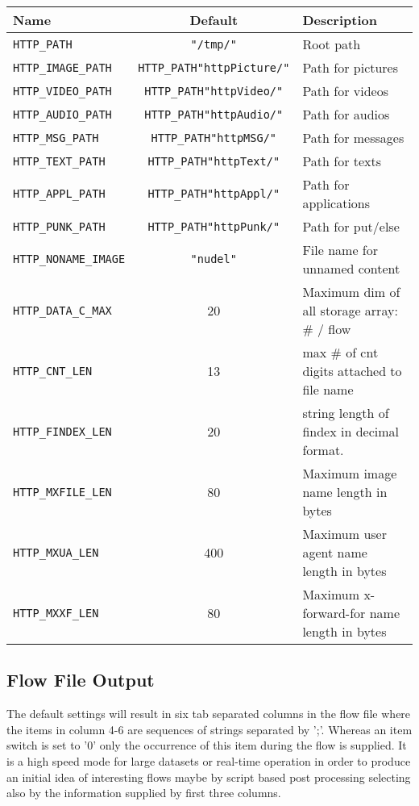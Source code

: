 \documentclass[documentation]{subfiles}
\begin{document}
\begin{longtable}{lcl}
    \toprule
    {\bf Name} & {\bf Default} & {\bf Description} \\
    \midrule\endhead%
    {\tt HTTP\_PATH} & {\tt "/tmp/"} & Root path \\
    {\tt HTTP\_IMAGE\_PATH}   & {\tt\small HTTP\_PATH"httpPicture/"} & Path for pictures \\
    {\tt HTTP\_VIDEO\_PATH}   & {\tt\small HTTP\_PATH"httpVideo/"}   & Path for videos \\
    {\tt HTTP\_AUDIO\_PATH}   & {\tt\small HTTP\_PATH"httpAudio/"}   & Path for audios \\
    {\tt HTTP\_MSG\_PATH}     & {\tt\small HTTP\_PATH"httpMSG/"}     & Path for messages \\
    {\tt HTTP\_TEXT\_PATH}    & {\tt\small HTTP\_PATH"httpText/"}    & Path for texts \\
    {\tt HTTP\_APPL\_PATH}    & {\tt\small HTTP\_PATH"httpAppl/"}    & Path for applications \\
    {\tt HTTP\_PUNK\_PATH}    & {\tt\small HTTP\_PATH"httpPunk/"}    & Path for put/else \\
    {\tt HTTP\_NONAME\_IMAGE} & {\tt\small "nudel"} & File name for unnamed content \\
    {\tt HTTP\_DATA\_C\_MAX}  &  20 & Maximum dim of all storage array: \# / flow \\
    {\tt HTTP\_CNT\_LEN}      &  13 & max \# of cnt digits attached to file name \\
    {\tt HTTP\_FINDEX\_LEN}   &  20 & string length of findex in decimal format. \\
    {\tt HTTP\_MXFILE\_LEN}   &  80 & Maximum image name length in bytes \\
    {\tt HTTP\_MXUA\_LEN}     & 400 & Maximum user agent name length in bytes \\
    {\tt HTTP\_MXXF\_LEN}     &  80 & Maximum x-forward-for name length in bytes \\
    \bottomrule
\end{longtable}

\subsection{Flow File Output}
The default settings will result in six tab separated columns in the flow file where the items
in column 4-6 are sequences of strings separated by ';'. Whereas an item switch is set to '0' only
the occurrence of this item during the flow is supplied. It is a high speed mode
for large datasets or real-time operation in order to produce an initial idea of
interesting flows maybe by script based post processing selecting also by the
information supplied by first three columns.
\end{document}
